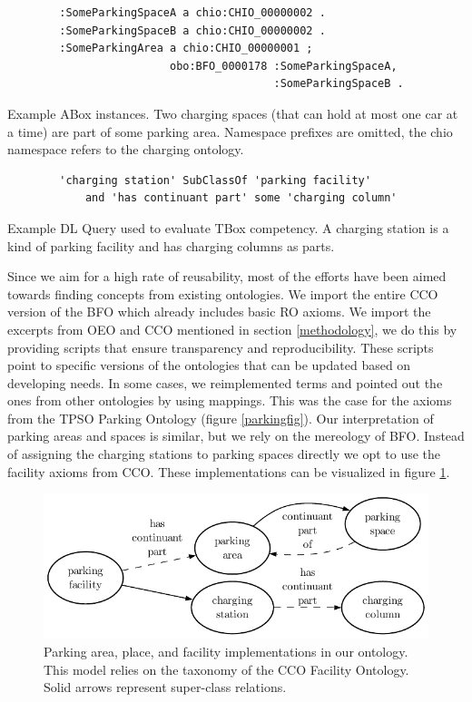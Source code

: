 \begin{listing}[h]
    \begin{verbatim}
        :SomeParkingSpaceA a chio:CHIO_00000002 .
        :SomeParkingSpaceB a chio:CHIO_00000002 .
        :SomeParkingArea a chio:CHIO_00000001 ;
                         obo:BFO_0000178 :SomeParkingSpaceA,
                                         :SomeParkingSpaceB .
    \end{verbatim}
    \caption{Example ABox instances. Two charging spaces (that can hold at most one car at a time) are part of some parking area. Namespace prefixes are omitted, the chio namespace refers to the charging ontology.}
    \label{lst:2}
\end{listing}

\begin{listing}[h]
    \begin{verbatim}
        'charging station' SubClassOf 'parking facility' 
            and 'has continuant part' some 'charging column'
    \end{verbatim}
    \caption{Example DL Query used to evaluate TBox competency. A charging station is a kind of parking facility and has charging columns as parts.}
    \label{lst:3}
\end{listing}

Since we aim for a high rate of reusability, most of the efforts have been aimed
towards finding concepts from existing ontologies. We import the entire CCO
version of the BFO which already includes basic RO axioms. We import the
excerpts from OEO and CCO mentioned in section \ref{methodology}, we do this by
providing scripts that ensure transparency and reproducibility. These scripts
point to specific versions of the ontologies that can be updated based on
developing needs. In some cases, we reimplemented terms and pointed out the ones
from other ontologies by using mappings. This was the case for the axioms from
the TPSO Parking Ontology (figure \ref{parkingfig}). Our interpretation of
parking areas and spaces is similar, but we rely on the mereology of BFO.
Instead of assigning the charging stations to parking spaces directly we opt to
use the facility axioms from CCO. These implementations can be visualized in
figure \ref{parkingchio}.

\begin{figure}[h]
    \centering
    \includegraphics{images/CHIOParking.pdf}
    \caption{Parking area, place, and facility implementations in our ontology. This model relies on the taxonomy of the CCO Facility Ontology. Solid arrows represent super-class relations.}
    \label{parkingchio}
\end{figure}



    